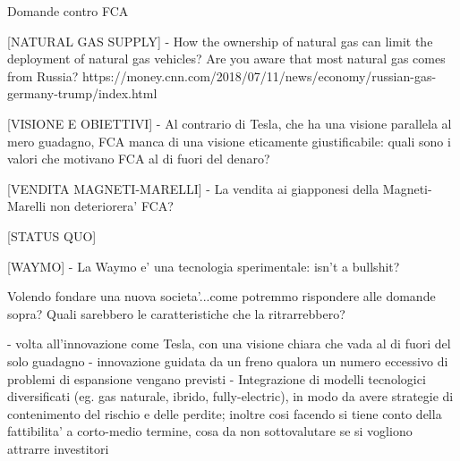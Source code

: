   
  
    
Domande contro FCA
    
[NATURAL GAS SUPPLY]
    - How the ownership of natural gas can limit the deployment of natural gas vehicles? Are you aware that most natural gas comes from Russia?                 https://money.cnn.com/2018/07/11/news/economy/russian-gas-germany-trump/index.html
    
[VISIONE E OBIETTIVI]
    - Al contrario di Tesla, che ha una visione parallela al mero guadagno, FCA manca di una visione eticamente giustificabile: quali sono i valori che motivano FCA al di fuori del denaro?
    
[VENDITA MAGNETI-MARELLI]
    - La vendita ai giapponesi della Magneti-Marelli non deteriorera' FCA?
    
[STATUS QUO]

[WAYMO]
    - La Waymo e' una tecnologia sperimentale: isn't a bullshit?
    
    
    
Volendo fondare una nuova societa'...come potremmo rispondere alle domande sopra? Quali sarebbero le caratteristiche che la ritrarrebbero?

    - volta all'innovazione come Tesla, con una visione chiara che vada al di fuori del solo guadagno
    - innovazione guidata da un freno qualora un numero eccessivo di problemi di espansione vengano previsti
    - Integrazione di modelli tecnologici diversificati (eg. gas naturale, ibrido, fully-electric), in modo da avere strategie di contenimento del rischio e delle perdite; inoltre cosi facendo si tiene conto della fattibilita' a corto-medio termine, cosa da non sottovalutare se si vogliono attrarre investitori
    
    
    




